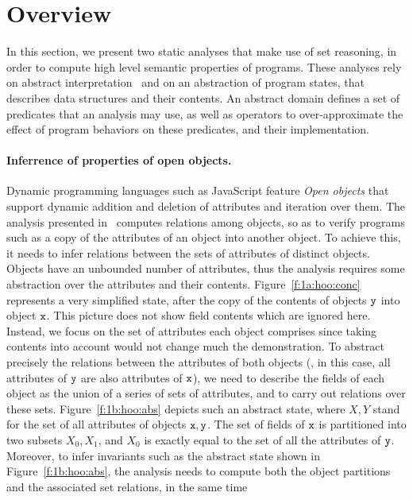 \section{Overview}
\label{s:2:over}
In this section, we present two static analyses that make use of set
reasoning, in order to compute high level semantic properties of
programs.
These analyses rely on abstract interpretation~\cite{cc:popl:77} and
on an abstraction of program states, that describes data structures
and their contents.
An abstract domain defines a set of predicates that an analysis may
use, as well as operators to over-approximate the effect of program
behaviors on these predicates, and their implementation.

\paragraph{Inferrence of properties of open objects.}
Dynamic programming languages such as JavaScript feature {\em Open objects}
that support dynamic addition and deletion of attributes and iteration over
them.
The analysis presented in~\cite{hoo:14:sas} computes relations among
objects, so as to verify programs such as a copy of the attributes of an
object into another object.
To achieve this, it needs to infer relations between the sets of attributes
of distinct objects.
Objects have an unbounded number of attributes, thus the analysis requires
some abstraction over the attributes and their contents.
Figure~\ref{f:1a:hoo:conc} represents a very simplified state, after
the copy of the contents of objects \( \mathtt{y} \) into object \( \mathtt{x} \).
This picture does not show field contents which are ignored here. %
Instead, we focus on the set of attributes each object comprises since
taking contents into account would not change much the demonstration.
To abstract precisely the relations between the attributes of both objects
(\ie, in this case, all attributes of \( \mathtt{y} \) are also attributes of
\( \mathtt{x} \)), we need to describe the fields of each object as the union
of a series of sets of attributes, and to carry out relations over these
sets.
Figure~\ref{f:1b:hoo:abs} depicts such an abstract state, where \( X, Y \)
stand for the set of all attributes of objects \( \mathtt{x}, \mathtt{y} \).
The set of fields of \( \mathtt{x} \) is partitioned into two subsets \( X_0,
X_1 \), and \( X_0 \) is exactly equal to the set of all the attributes
of \( \mathtt{y} \).
Moreover, to infer invariants such as the abstract state shown in
Figure~\ref{f:1b:hoo:abs}, the analysis needs to compute both the
object partitions and the associated set relations, in the same time
